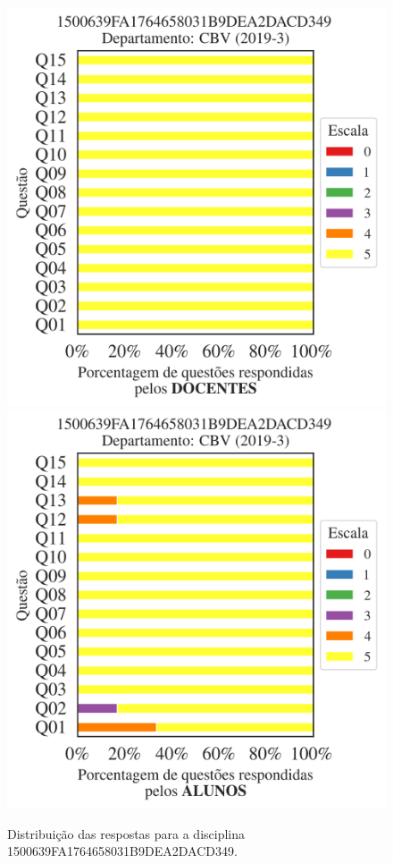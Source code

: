 \documentclass[a4paper,10pt]{article}
\begin{document}
\begin{figure}[h]
\centering
\includegraphics[width=0.485\linewidth]{analise_disciplina_departamento_CBV_1500639FA1764658031B9DEA2DACD349_docentes.png}
\includegraphics[width=0.485\linewidth]{analise_disciplina_departamento_CBV_1500639FA1764658031B9DEA2DACD349_alunos.png}
\caption{\label{fig:analise_geral_departamento}                Distribuição das respostas para a disciplina 1500639FA1764658031B9DEA2DACD349. }
\end{figure}
\end{document}
